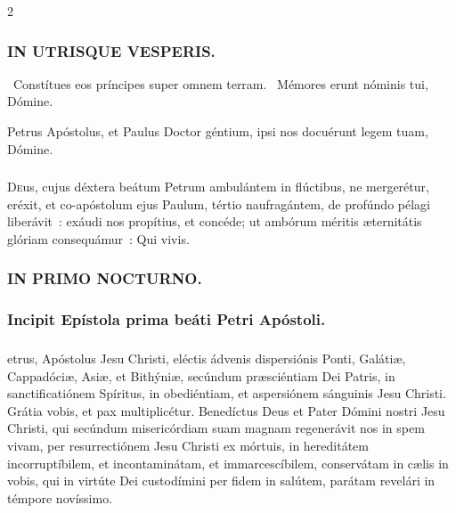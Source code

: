 \documentclass[9pt,twoside]{extarticle}
\begin{document}
\begin{multicols}{2}
{{{\subsubsection*{\center \textsc{IN UTRISQUE VESPERIS.}}
\begin{tightlist}{}
\item {}~Constítues eos príncipes super omnem terram. ~Mémores erunt nóminis tui, Dómine.
\item {} Petrus Apóstolus, et Paulus Doctor géntium, ipsi nos docuérunt legem tuam, Dómine.
\end{tightlist}

\subsubsection*{\center {}}
\lettrine{D}eus, cujus déxtera beátum Petrum ambulántem in flúctibus, ne mergerétur, eréxit, et co-apóstolum ejus Paulum, tértio naufragántem, de profúndo pélagi liberávit~: exáudi nos propítius, et concéde; ut ambórum méritis æternitátis glóriam consequámur~: Qui vivis.

\subsubsection*{\center \textsc{IN PRIMO NOCTURNO.}}
\begin{tightlist}{}
\item {}
\item {}
\end{tightlist}

\subsubsection*{\center Incipit Epístola prima beáti Petri Apóstoli.}
\subsubsection*{\center {}}
etrus, Apóstolus Jesu Christi, eléctis ádvenis dispersiónis Ponti, Galátiæ, Cappadóciæ, Asiæ, et Bithýniæ,
secúndum præsciéntiam Dei Patris, in sanctificatiónem Spíritus, in obediéntiam, et aspersiónem sánguinis Jesu Christi. Grátia vobis, et pax multiplicétur.
Benedíctus Deus et Pater Dómini nostri Jesu Christi, qui secúndum misericórdiam suam magnam regenerávit nos in spem vivam, per resurrectiónem Jesu Christi ex mórtuis,
in hereditátem incorruptíbilem, et incontaminátam, et immarcescíbilem, conservátam in cælis in vobis,
qui in virtúte Dei custodímini per fidem in salútem, parátam revelári in témpore novíssimo.

}}}
\end{multicols}
\end{document}
